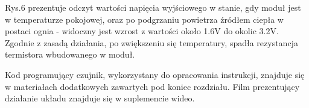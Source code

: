 \documentclass[11pt, a4paper]{article}
\begin{document}
Rys.6 prezentuje odczyt wartości napięcia wyjściowego w stanie, gdy moduł jest w temperaturze pokojowej, oraz po podgrzaniu powietrza źródłem ciepła w postaci ognia - widoczny jest wzrost z wartości około 1.6V do okolic 3.2V. Zgodnie z zasadą działania, po zwiększeniu się temperatury, spadła rezystancja termistora wbudowanego w moduł.
\newline 

Kod programujący czujnik, wykorzystany do opracowania instrukcji, znajduje się w materiałach dodatkowych zawartych pod koniec rozdziału.
\newline
Film prezentujący działanie układu znajduje się w suplemencie wideo.
\printbibliography[heading=bibintoc]
\end{document}
